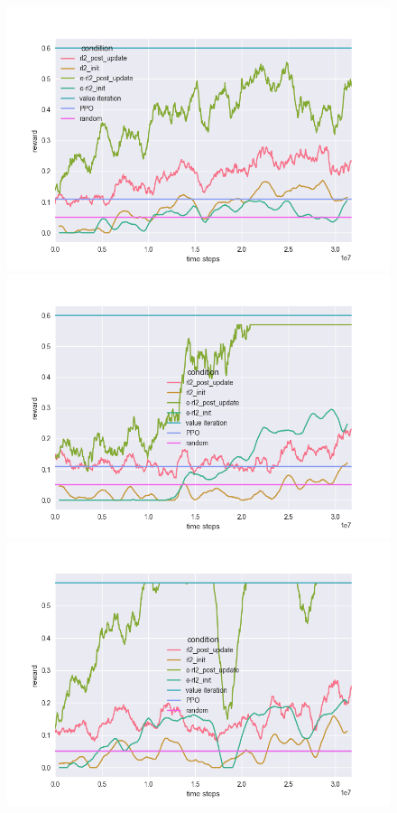 \begin{figure}[H]
\begin{center}
\includegraphics[scale=0.335]{bradly_curves/gap_grids_rl2_0.png}%
\includegraphics[scale=0.335]{bradly_curves/gap_grids_rl2_1.png} \\
\includegraphics[scale=0.335]{bradly_curves/gap_grids_rl2_2.png}%

\end{center}
\end{figure}

